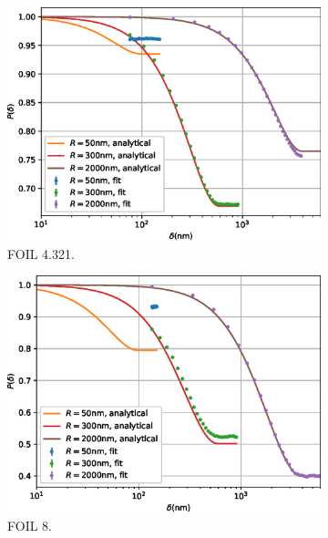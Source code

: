 \begin{figure}[p]
	\centering
	\begin{subfigure}[b]{0.45\textwidth}
		\centering
		\includegraphics[width=\textwidth]{simulation-plot-gauss-FOIL-4.321}
		\caption{FOIL 4.321.}
		\label{fig:simulation-plot-gauss-FOIL-4.321}
	\end{subfigure}
	\hfill
	\begin{subfigure}[b]{0.45\textwidth}
		\centering
		\includegraphics[width=\textwidth]{simulation-plot-gauss-FOIL-8}
		\caption{FOIL 8.}
		\label{fig:simulation-plot-gauss-FOIL-8}
	\end{subfigure}
	\centering
	\begin{subfigure}[b]{0.45\textwidth}
		\centering

\end{subfigure}
\end{figure}
